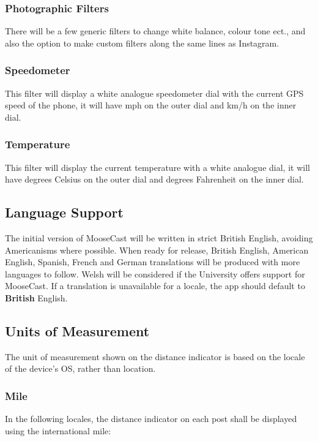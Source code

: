 \documentclass[12pt, a4paper]{article}
\begin{document}
\subsubsection{Photographic Filters}
There will be a few generic filters to change white balance, colour tone ect., and also the option to make custom filters along the same lines as Instagram.
\subsubsection{Speedometer}
This filter will display a white analogue speedometer dial with the current GPS speed of the phone, it will have mph on the outer dial and km/h on the inner dial.
\subsubsection{Temperature}
This filter will display the current temperature with a white analogue dial, it will have degrees Celsius on the outer dial and degrees Fahrenheit on the inner dial.
\subsection{Language Support}
The initial version of MooseCast will be written in strict British English, avoiding Americanisms where possible. When ready for release, British English, American English, Spanish, French and German translations will be produced with more languages to follow. Welsh will be considered if the University offers support for MooseCast. If a translation is unavailable for a locale, the app should default to \textbf{British} English.
\clearpage 
\subsection{Units of Measurement}
The unit of measurement shown on the distance indicator is based on the locale of the device's OS, rather than location.
\subsubsection{Mile}
In the following locales, the distance indicator on each post shall be displayed using the international mile:
\end{document}
